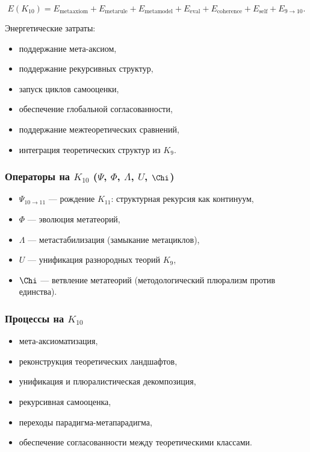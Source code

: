 \[
E(K_{10})=
E_{\mathrm{metaaxiom}}+
E_{\mathrm{metarule}}+
E_{\mathrm{metamodel}}+
E_{\mathrm{eval}}+
E_{\mathrm{coherence}}+
E_{\mathrm{self}}+
E_{9\to10}.
\]

Энергетические затраты:
\begin{itemize}
    \item поддержание мета-аксиом,
    \item поддержание рекурсивных структур,
    \item запуск циклов самооценки,
    \item обеспечение глобальной согласованности,
    \item поддержание межтеоретических сравнений,
    \item интеграция теоретических структур из $K_9$.
\end{itemize}

\subsubsection{Операторы на $K_{10}$ ($\Psi$, $\Phi$, $\Lambda$, $U$, $\Chi$)}

\begin{itemize}
    \item $\Psi_{10\to11}$ — рождение $K_{11}$: структурная рекурсия как континуум,
    \item $\Phi$ — эволюция метатеорий,
    \item $\Lambda$ — метастабилизация (замыкание метациклов),
    \item $U$ — унификация разнородных теорий $K_9$,
    \item $\Chi$ — ветвление метатеорий (методологический плюрализм против единства).
\end{itemize}

\subsubsection{Процессы на $K_{10}$}

\begin{itemize}
    \item мета-аксиоматизация,
    \item реконструкция теоретических ландшафтов,
    \item унификация и плюралистическая декомпозиция,
    \item рекурсивная самооценка,
    \item переходы парадигма-метапарадигма,
    \item обеспечение согласованности между теоретическими классами.
\end{itemize}

